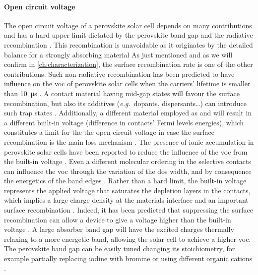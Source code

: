 	\paragraph{Open circuit voltage}
	The open circuit voltage of a perovskite solar cell depends on many contributions and has a hard upper limit dictated by the perovskite band gap and the radiative recombination \cite{Tress2017,Tress2015a}.
	This recombination is unavoidable as it originates by the detailed balance for a strongly absorbing material \cite[24]{Nelson2003}
	As just mentioned and as we will confirm in \cref{ch:characterization}, the surface recombination rate is one of the other contributions.
	Such non\hyp{}radiative recombination has been predicted to have influence on the \gls{voc} of perovskite solar cells when the carriers' lifetime is smaller than \SI{10}{\us} \cite{Tress2017,Kirchartz2019}.
	A contact material having mid-gap states will favour the surface recombination, but also its additives (\textsl{e.g.}\ dopants, dispersants\dots) can introduce such trap states \cite{Correa-Baena2017}.
	Additionally, a different material employed as  and  will result in a different built-in voltage (difference in contacts' Fermi levels energies), which constitutes a limit for the the open circuit voltage \cite{Gelmetti2019,Wu2016} in case the surface recombination is the main loss mechanism \cite{Tress2017}.
	The presence of ionic accumulation in perovskite solar cells have been reported to reduce the influence of the \gls{voc} from the built-in voltage \cite{Belisle2016}.
	Even a different molecular ordering in the selective contacts can influence the \gls{voc} through the variation of the \gls{dos} width, and by consequence the energetics of the band edges \cite{Shao2016}.
	Rather than a hard limit, the built-in voltage represents the applied voltage that saturates the depletion layers in the contacts, which implies a large charge density at the materials interface and an important surface recombination \cite{Gelmetti2019,Kirchartz2019}.
	Indeed, it has been predicted that suppressing the surface recombination can allow a device to give a voltage higher than the built-in voltage \cite{Kirchartz2019}.
	A large absorber band gap will have the excited charges thermally relaxing to a more energetic band, allowing the solar cell to achieve a higher \gls{voc}.
	The perovskite band gap can be easily tuned changing its stoichiometry, for example partially replacing iodine with bromine \cite{McMeekin2016,Noh2013a,Wheeler2017} or using different organic cations \cite{Eperon2014}.
